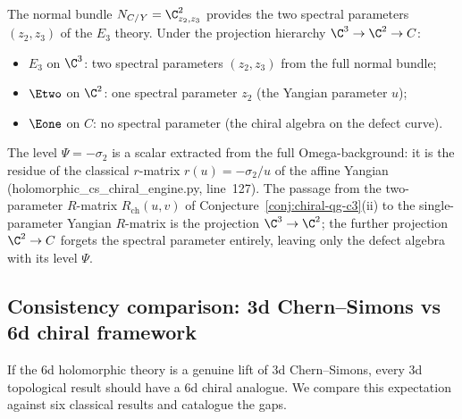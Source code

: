 \begin{remark}
\label{rem:normal-bundle-spectral}
The normal bundle $N_{C/Y} = \C^2_{z_2, z_3}$ provides the two spectral parameters $(z_2, z_3)$ of the $E_3$ theory. Under the projection hierarchy $\C^3 \to \C^2 \to C$:
\begin{itemize}
 \item $E_3$ on $\C^3$: two spectral parameters $(z_2, z_3)$ from the full normal bundle;
 \item $\Etwo$ on $\C^2$: one spectral parameter $z_2$ (the Yangian parameter $u$);
 \item $\Eone$ on $C$: no spectral parameter (the chiral algebra on the defect curve).
\end{itemize}
The level $\Psi = -\sigma_2$ is a scalar extracted from the full Omega-background: it is the residue of the classical $r$-matrix $r(u) = -\sigma_2/u$ of the affine Yangian (holomorphic\_cs\_chiral\_engine.py, line~127). The passage from the two-parameter $R$-matrix $R_{\mathrm{ch}}(u, v)$ of Conjecture~\ref{conj:chiral-qg-c3}(ii) to the single-parameter Yangian $R$-matrix is the projection $\C^3 \to \C^2$; the further projection $\C^2 \to C$ forgets the spectral parameter entirely, leaving only the defect algebra with its level $\Psi$.
\end{remark}



\subsection{Consistency comparison: 3d Chern--Simons vs 6d chiral framework}
\label{subsec:cfg25-adversarial}

If the 6d holomorphic theory is a genuine lift of 3d Chern--Simons, every 3d topological result should have a 6d chiral analogue. We compare this expectation against six classical results and catalogue the gaps.


